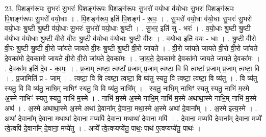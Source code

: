 \documentclass[17pt]{extarticle}
\begin{document}
23. पि॒शङ्ग॑रूपः सु॒भरः॑ सु॒भरः॑ पि॒शङ्ग॑रूपः पि॒शङ्ग॑रूपः सु॒भरो॑ वयो॒धा व॑यो॒धाः सु॒भरः॑ पि॒शङ्ग॑रूपः पि॒शङ्ग॑रूपः सु॒भरो॑ वयो॒धाः । . पि॒शङ्ग॑रूप॒ इति॑ पि॒शङ्ग॑ - रू॒पः॒ । . सु॒भरो॑ वयो॒धा व॑यो॒धाः सु॒भरः॑ सु॒भरो॑ वयो॒धाः श्रु॒ष्टी श्रु॒ष्टी व॑यो॒धाः सु॒भरः॑ सु॒भरो॑ वयो॒धाः श्रु॒ष्टी । . सु॒भर॒ इति॑ सु - भरः॑ । . व॒यो॒धाः श्रु॒ष्टी श्रु॒ष्टी व॑यो॒धा व॑यो॒धाः श्रु॒ष्टी वी॒रो वी॒रः श्रु॒ष्टी व॑यो॒धा व॑यो॒धाः श्रु॒ष्टी वी॒रः । . व॒यो॒धा इति॑ वयः - धाः । . श्रु॒ष्टी वी॒रो वी॒रः श्रु॒ष्टी श्रु॒ष्टी वी॒रो जा॑यते जायते वी॒रः श्रु॒ष्टी श्रु॒ष्टी वी॒रो जा॑यते । . वी॒रो जा॑यते जायते वी॒रो वी॒रो जा॑यते दे॒वका॑मो दे॒वका॑मो जायते वी॒रो वी॒रो जा॑यते दे॒वका॑मः । . जा॒य॒ते॒ दे॒वका॑मो दे॒वका॑मो जायते जायते दे॒वका॑मः । . दे॒वका॑म॒ इति॑ दे॒व - का॒मः॒ । . प्र॒जाम् त्वष्टा॒ त्वष्टा᳚ प्र॒जाम् प्र॒जाम् त्वष्टा॒ वि वि त्वष्टा᳚ प्र॒जाम् प्र॒जाम् त्वष्टा॒ वि । . प्र॒जामिति॑ प्र - जाम् । . त्वष्टा॒ वि वि त्वष्टा॒ त्वष्टा॒ वि ष्य॑तु स्यतु॒ वि त्वष्टा॒ त्वष्टा॒ वि ष्य॑तु । . वि ष्य॑तु स्यतु॒ वि वि ष्य॑तु॒ नाभि॒म् नाभिꣳ॑ स्यतु॒ वि वि ष्य॑तु॒ नाभि᳚म् । . स्य॒तु॒ नाभि॒म् नाभिꣳ॑ स्यतु स्यतु॒ नाभि॑ म॒स्मे अ॒स्मे नाभिꣳ॑ स्यतु स्यतु॒ नाभि॑ म॒स्मे । . नाभि॑ म॒स्मे अ॒स्मे नाभि॒म् नाभि॑ म॒स्मे अथाथा॒स्मे नाभि॒म् नाभि॑ म॒स्मे अथ॑ । . अ॒स्मे अथाथा॒स्मे अ॒स्मे अथा॑ दे॒वाना᳚म् दे॒वाना॒ मथा॒स्मे अ॒स्मे अथा॑ दे॒वाना᳚म् । . अ॒स्मे इत्य॒स्मे । . अथा॑ दे॒वाना᳚म् दे॒वाना॒ मथाथा॑ दे॒वाना॒ मप्यपि॑ दे॒वाना॒ मथाथा॑ दे॒वाना॒ मपि॑ । . दे॒वाना॒ मप्यपि॑ दे॒वाना᳚म् दे॒वाना॒ मप्ये᳚ त्वे॒त्वपि॑ दे॒वाना᳚म् दे॒वाना॒ मप्ये॑तु । . अप्ये᳚ त्वे॒त्वप्यप्ये॑तु॒ पाथः॒ पाथ॑ ए॒त्वप्यप्ये॑तु॒ पाथः॑ । \newline
\end{document}
